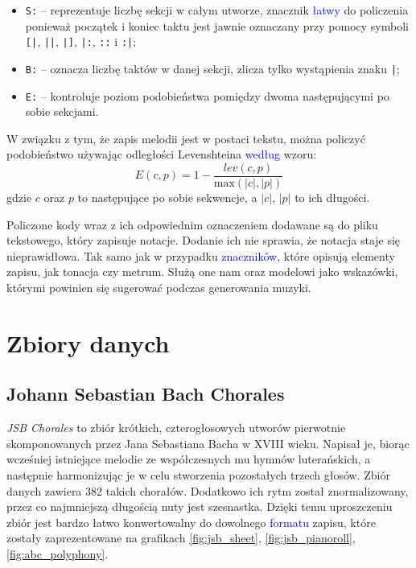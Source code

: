 \documentclass[data-science]{agh-wi} %
\begin{document}
\begin{itemize}
    \item \texttt{S:} -- reprezentuje liczbę sekcji w całym utworze, znacznik \textcolor{blue}{łatwy} do policzenia ponieważ początek i koniec taktu jest jawnie oznaczany przy pomocy symboli \texttt{[|}, \texttt{||}, \texttt{|]}, \texttt{|:}, \texttt{::} i \texttt{:|};
    \item \texttt{B:} -- oznacza liczbę taktów w danej sekcji, zlicza tylko wystąpienia znaku \texttt{|};
    \item \texttt{E:} -- kontroluje poziom podobieństwa pomiędzy dwoma następującymi po sobie sekcjami.
\end{itemize}

W związku z tym, że zapis melodii jest w postaci tekstu, można policzyć podobieństwo używając odległości Levenshteina \textcolor{blue}{według} wzoru:
\begin{equation}
    E(c,p) = 1 - \dfrac{lev(c, p)}{\text{max}(|c|, |p|)}
\end{equation} %
gdzie $c$ oraz $p$ to następujące po sobie sekwencje, a $|c|$, $|p|$ to ich długości.

Policzone kody wraz z ich odpowiednim oznaczeniem dodawane są do pliku tekstowego, który zapisuje notacje. Dodanie ich nie sprawia, że notacja staje się nieprawidłowa. Tak samo jak w przypadku \textcolor{blue}{znaczników}, które opisują elementy zapisu, jak tonacja czy metrum. Służą one nam oraz modelowi jako wskazówki, którymi powinien się sugerować podczas generowania muzyki.

\section{Zbiory danych}

\subsection{Johann Sebastian Bach Chorales}
\textit{JSB Chorales} \cite{bachchorales} to zbiór krótkich, czterogłosowych utworów pierwotnie skomponowanych przez Jana Sebastiana Bacha w XVIII wieku. Napisał je, biorąc wcześniej istniejące melodie ze współczesnych mu hymnów luterańskich, a następnie harmonizując je w celu stworzenia pozostałych trzech głosów. Zbiór danych zawiera 382 takich chorałów. Dodatkowo ich rytm został znormalizowany, przez co najmniejszą długością nuty jest szesnastka. Dzięki temu uproszczeniu zbiór jest bardzo łatwo konwertowalny do dowolnego \textcolor{blue}{formatu} zapisu, które zostały zaprezentowane na grafikach \ref*{fig:jsb_sheet}, \ref*{fig:jsb_pianoroll}, \ref*{fig:abc_polyphony}.
\end{document}
